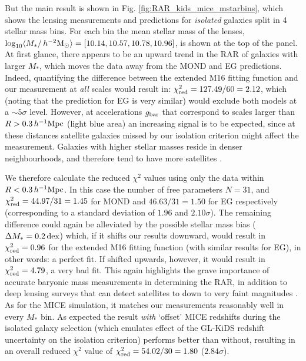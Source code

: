 \documentclass[usenatbib]{mnras}
\newcommand{\hmsun}{\,h^{-2} {\rm M_\odot}}
\newcommand{\hMpc}{\, h^{-1}{\rm{Mpc}} }
\newcommand{\lan}{\langle}
\newcommand{\ran}{\rangle}
\newcommand{\un}[1]{_{\rm #1}}
\newcommand{\dex}{\, {\rm dex}}
\begin{document}
But the main result is shown in Fig. \ref{fig:RAR_kids_mice_mstarbins}, which shows the lensing measurements and predictions for \emph{isolated} galaxies split in 4 stellar mass bins. For each bin the mean stellar mass of the lenses, $\log_{10}\lan M_*/\hmsun \ran = [10.14, 10.57, 10.78, 10.96]$, is shown at the top of the panel. At first glance, there appears to be an upward trend in the RAR of galaxies with larger $M_*$, which moves the data away from the MOND and EG predictions. Indeed, quantifying the difference between the extended M16 fitting function and our measurement at \emph{all} scales would result in: $\chi\un{red}^2 = 127.49 / 60 = 2.12$, which (noting that the prediction for EG is very similar) would exclude both models at a $\sim5 \sigma$ level. However, at accelerations $g\un{bar}$ that correspond to scales larger than $R > 0.3 \hMpc$ (light blue area) an increasing signal is to be expected, since at these distances satellite galaxies missed by our isolation criterion might affect the measurement. Galaxies with higher stellar masses reside in denser neighbourhoods, and therefore tend to have more satellites \cite[see e.g.]{baldry2006, bolzonella2010, brouwer2016}.

We therefore calculate the reduced $\chi^2$ values using only the data within $R < 0.3 \hMpc$. In this case the number of free parameters $N = 31$, and $\chi\un{red}^2 = 44.97 / 31 = 1.45$ for MOND and $46.63 / 31 = 1.50$ for EG respectively (corresponding to a standard deviation of $1.96$ and $2.10\sigma$). The remaining difference could again be alleviated by the possible stellar mass bias ($\Delta M_* = 0.2 \dex$) which, if it shifts our results downward, would result in $\chi\un{red}^2 = 0.96$ for the extended M16 fitting function (with similar results for EG), in other words: a perfect fit. If shifted upwards, however, it would result in $\chi\un{red}^2=4.79$, a very bad fit. This again highlights the grave importance of accurate baryonic mass measurements in determining the RAR, in addition to deep lensing surveys that can detect satellites to down to very faint magnitudes \cite[such as the future Euclid survey;][]{laureijs2011}. As for the MICE simulation, it matches our measurements reasonably well in every $M_*$ bin. As expected the result \emph{with} `offset' MICE redshifts during the isolated galaxy selection (which emulates effect of the GL-KiDS redshift uncertainty on the isolation criterion) performs better than without, resulting in an overall reduced $\chi^2$ value of $\chi\un{red}^2 = 54.02 / 30 = 1.80$ ($2.84 \sigma$).
\end{document}
